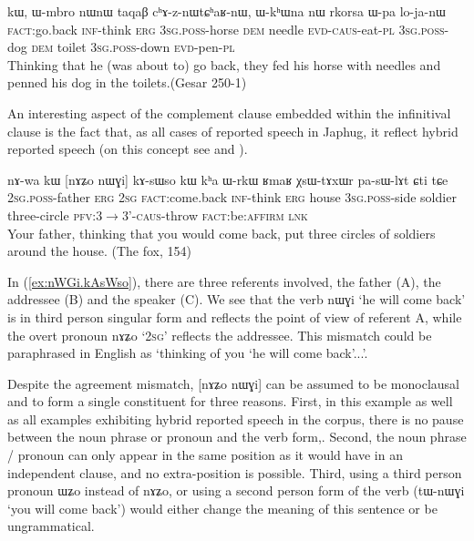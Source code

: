 \documentclass[oldfontcommands,oneside,a4paper,11pt]{article}
\newcommand{\ipa}[1]{{\phon \mbox{#1}}} %
\newcommand{\refb}[1]{(\ref{#1})}
\begin{document}
  \begin{exe}
\ex \label{ex:nWCe.kAsWso}
\gll 
[\ipa{nɯɕe}]  	\ipa{kɤ-sɯso}  	\ipa{kɯ,}  	\ipa{ɯ-mbro}  	\ipa{nɯnɯ}  	\ipa{taqaβ}  	\ipa{cʰɤ-z-nɯtɕʰaʁ-nɯ,}  	\ipa{ɯ-kʰɯna}  	\ipa{nɯ}  	\ipa{rkorsa}  	\ipa{ɯ-pa}  	\ipa{lo-ja-nɯ}  \\
\textsc{fact}:go.back \textsc{inf}-think \textsc{erg} \textsc{3sg.poss}-horse \textsc{dem} needle \textsc{evd-caus}-eat-\textsc{pl}   \textsc{3sg.poss}-dog \textsc{dem} toilet \textsc{3sg.poss}-down \textsc{evd}-pen-\textsc{pl} \\
\glt Thinking that he (was about to) go back, they fed his horse with needles and penned his dog in the toilets.(Gesar 250-1)
 \end{exe}
 
An interesting aspect  of the complement clause embedded within the infinitival clause is the fact that, as all cases of reported speech in Japhug, it reflect hybrid reported speech (on this concept see \citealt{tournadre08conjunct} and \citealt{aikhenvald08semidirect}).
 
  \begin{exe}
\ex \label{ex:nWGi.kAsWso}
\gll 
\ipa{nɤ-wa}  	\ipa{kɯ}  	[\ipa{nɤʑo}  	\ipa{nɯɣi}]  	\ipa{kɤ-sɯso}  	\ipa{kɯ}  	\ipa{kʰa}  	\ipa{ɯ-rkɯ}  	\ipa{ʁmaʁ}  	\ipa{χsɯ-tɤxɯr}  	\ipa{pa-sɯ-lɤt}  	\ipa{ɕti}  	\ipa{tɕe}  \\
\textsc{2sg.poss}-father \textsc{erg} \textsc{2sg} \textsc{fact}:come.back  \textsc{inf}-think \textsc{erg} house \textsc{3sg.poss}-side soldier three-circle \textsc{pfv:3$\rightarrow$3'-caus}-throw \textsc{fact}:be:\textsc{affirm} \textsc{lnk}\\
\glt Your father, thinking that you would come back,   put three circles of soldiers around the house. (The fox, 154)

 \end{exe}
 
In \refb{ex:nWGi.kAsWso}, there are three referents involved, the father (A), the addressee (B) and the speaker (C). We see that the verb  	\ipa{nɯɣi} `he will come back' is in third person singular form and reflects the point of view of referent A, while the overt pronoun \ipa{nɤʑo} `\textsc{2sg}' reflects the addressee. This mismatch could be paraphrased in English as `thinking of you `he will come back'...'.  

Despite the agreement mismatch, 	[\ipa{nɤʑo}  	\ipa{nɯɣi}] can be assumed to be monoclausal and to form a single constituent for three reasons. First, in this example as well as all examples exhibiting   hybrid reported speech in the corpus, there is no   pause between the noun phrase or pronoun and the verb form,. Second,  the noun phrase / pronoun can only appear in the same position as it would have in an independent clause, and no extra-position is possible. Third, using a third person pronoun \ipa{ɯʑo} instead of \ipa{nɤʑo}, or using a second person form of the verb (\ipa{tɯ-nɯɣi} `you will come back') would either change the meaning of this sentence or be ungrammatical.
 
\end{document}
